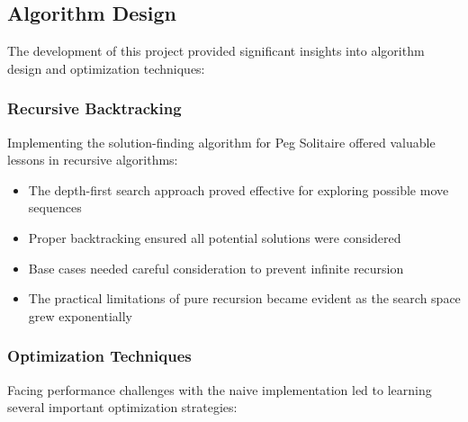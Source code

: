 \subsection{Algorithm Design}
The development of this project provided significant insights into algorithm design and optimization techniques:

\subsubsection{Recursive Backtracking}
Implementing the solution-finding algorithm for Peg Solitaire offered valuable lessons in recursive algorithms:

\begin{itemize}
    \item The depth-first search approach proved effective for exploring possible move sequences
    \item Proper backtracking ensured all potential solutions were considered
    \item Base cases needed careful consideration to prevent infinite recursion
    \item The practical limitations of pure recursion became evident as the search space grew exponentially
\end{itemize}

\subsubsection{Optimization Techniques}
Facing performance challenges with the naive implementation led to learning several important optimization strategies:

